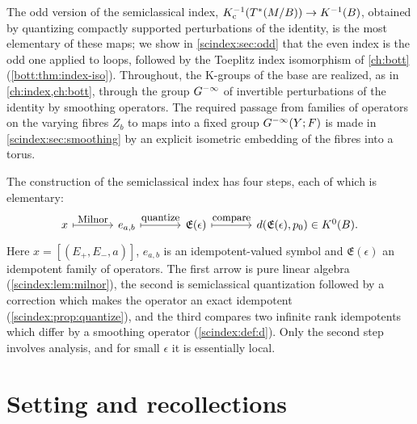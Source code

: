 The odd version of the semiclassical index, $K_{\mathrm{c}}^{-1}(T^*(M/B))\to K^{-1}(B)$,
obtained by quantizing compactly supported perturbations of the identity, is the
most elementary of these maps; we show in \cref{scindex:sec:odd} that the even
index is the odd one applied to loops, followed by the Toeplitz index
isomorphism of \cref{ch:bott} (\cref{bott:thm:index-iso}). Throughout, the K-groups of the base are realized,
as in \cref{ch:index,ch:bott}, through the group $G^{-\infty}$ of invertible
perturbations of the identity by smoothing operators. The required passage from
families of operators on the varying fibres $Z_b$ to maps into a fixed group
$G^{-\infty}(Y;F)$ is made in \cref{scindex:sec:smoothing} by an explicit isometric
embedding of the fibres into a torus.

\begin{discussion}
  The construction of the semiclassical index has four steps, each of which is
  elementary:
  \begin{equation*}
    \begin{tikzcd}[column sep=large]
      x\arrow[r,mapsto,"\text{\small Milnor}"]&e_{a,b}
      \arrow[r,mapsto,"\text{\small quantize}"]&\mathfrak E(\epsilon)
      \arrow[r,mapsto,"\text{\small compare}"]&d(\mathfrak E(\epsilon),p_0)\in K^0(B).
    \end{tikzcd}
  \end{equation*}
  Here $x=[(E_+,E_-,a)]$, $e_{a,b}$ is an idempotent-valued symbol and
  $\mathfrak E(\epsilon)$ an idempotent family of operators.
  The first arrow is pure linear algebra (\cref{scindex:lem:milnor}), the second
  is semiclassical quantization followed by a correction which makes the operator
  an exact idempotent (\cref{scindex:prop:quantize}), and the third compares two
  infinite rank idempotents which differ by a smoothing operator
  (\cref{scindex:def:d}). Only the second step involves analysis, and for small
  $\epsilon$ it is essentially local.
\end{discussion}

\section{Setting and recollections}\label{scindex:sec:setting}

